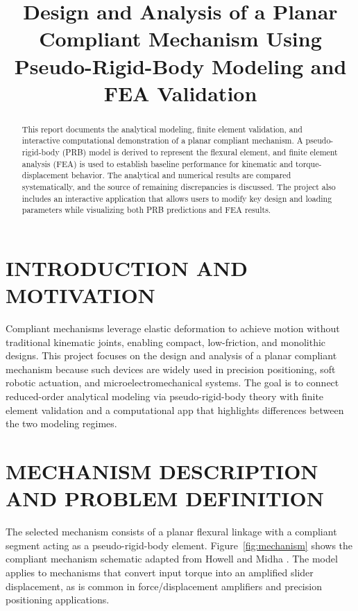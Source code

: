 \documentclass[colorlinks,upint,subscriptcorrection,varvw,hyphenate]{asmeconf}
\begin{document}

\title{Design and Analysis of a Planar Compliant Mechanism Using Pseudo-Rigid-Body Modeling and FEA Validation}

\maketitle


\begin{abstract}
This report documents the analytical modeling, finite element validation, and interactive computational demonstration of a planar compliant mechanism. A pseudo-rigid-body (PRB) model is derived to represent the flexural element, and finite element analysis (FEA) is used to establish baseline performance for kinematic and torque-displacement behavior. The analytical and numerical results are compared systematically, and the source of remaining discrepancies is discussed. The project also includes an interactive application that allows users to modify key design and loading parameters while visualizing both PRB predictions and FEA results.
\end{abstract}

\section{INTRODUCTION AND MOTIVATION}
Compliant mechanisms leverage elastic deformation to achieve motion without traditional kinematic joints, enabling compact, low-friction, and monolithic designs. This project focuses on the design and analysis of a planar compliant mechanism because such devices are widely used in precision positioning, soft robotic actuation, and microelectromechanical systems. The goal is to connect reduced-order analytical modeling via pseudo-rigid-body theory with finite element validation and a computational app that highlights differences between the two modeling regimes.

\section{MECHANISM DESCRIPTION AND PROBLEM DEFINITION}
The selected mechanism consists of a planar flexural linkage with a compliant segment acting as a pseudo-rigid-body element. Figure~\ref{fig:mechanism} shows the compliant mechanism schematic adapted from Howell and Midha \cite{howell1995parametric}. The model applies to mechanisms that convert input torque into an amplified slider displacement, as is common in force/displacement amplifiers and precision positioning applications.
\end{document}
